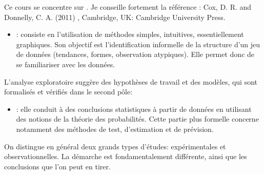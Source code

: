\documentclass[letterpaper,10pt,english]{jupyterBook}
\begin{document}
\sphinxAtStartPar
Ce cours se concentre sur .
Je conseille fortement la référence : Cox, D. R.  and Donnelly, C. A. (2011) , Cambridge, UK: Cambridge University Press.
\begin{itemize}
\item {} 
\sphinxAtStartPar
{}: consiste en l’utilisation de méthodes simples, intuitives, essentiellement graphiques. Son objectif est l’identification informelle de la structure d’un jeu de données (tendances, formes, observation atypiques). Elle permet donc de se familiariser avec les données.

\end{itemize}

\sphinxAtStartPar
L’analyse exploratoire suggère des hypothèses de travail et des modèles, qui sont formalisés et vérifiés dans le second pôle:
\begin{itemize}
\item {} 
\sphinxAtStartPar
{}: elle conduit à des conclusions statistiques à partir de données en utilisant des notions de la théorie des probabilités. Cette partie plus formelle concerne notamment des méthodes de test, d’estimation et de prévision.

\end{itemize}

\sphinxAtStartPar
On distingue en général deux grands types d’études: expérimentales et observationnelles. La démarche est fondamentalement différente, ainsi que les conclusions que l’on peut en tirer.
\end{document}
